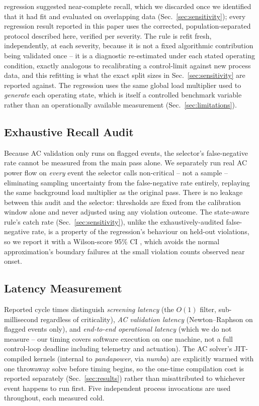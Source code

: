 \documentclass[11pt,conference]{IEEEtran}
\begin{document}
regression suggested near-complete recall, which we discarded once we identified that it had fit
and evaluated on overlapping data (Sec.~\ref{sec:sensitivity}); every regression result reported in
this paper uses the corrected, population-separated protocol described here, verified per severity.
The rule is refit fresh,
independently, at each severity, because it is not a fixed algorithmic contribution being validated
once -- it is a diagnostic re-estimated under each stated operating condition, exactly analogous to
recalibrating a control-limit against new process data, and this refitting is what the exact split
sizes in Sec.~\ref{sec:sensitivity} are reported against. The regression uses the same global load
multiplier used to \textit{generate} each operating state, which is itself a controlled benchmark
variable rather than an operationally available measurement (Sec.~\ref{sec:limitations}).

\subsection{Exhaustive Recall Audit}
\label{sec:audit}
Because AC validation only runs on flagged events, the selector's false-negative rate cannot be
measured from the main pass alone. We separately run real AC power flow on \textit{every} event the
selector calls non-critical -- not a sample -- eliminating sampling uncertainty from the
false-negative rate entirely, replaying the same background load multiplier as the original pass.
There is no leakage between this audit and the selector: thresholds are fixed from the calibration
window alone and never adjusted using any violation outcome. The state-aware rule's catch rate
(Sec.~\ref{sec:sensitivity}), unlike the exhaustively-audited false-negative rate, is a property of
the regression's behaviour on held-out violations, so we report it with a Wilson-score 95\% CI
\cite{ref:wilson1927}, which avoids the normal approximation's boundary failures at the small
violation counts observed near onset.

\subsection{Latency Measurement}
\label{sec:latency_method}
Reported cycle times distinguish \textit{screening latency} (the $O(1)$ filter, sub-millisecond
regardless of criticality), \textit{AC validation latency} (Newton--Raphson on flagged events only),
and \textit{end-to-end operational latency} (which we do not measure -- our timing covers software
execution on one machine, not a full control-loop deadline including telemetry and actuation). The
AC solver's JIT-compiled kernels (internal to \textit{pandapower}, via \textit{numba}) are
explicitly warmed with one throwaway solve before timing begins, so the one-time compilation cost is
reported separately (Sec.~\ref{sec:results}) rather than misattributed to whichever event happens to
run first. Five independent process invocations are used throughout, each measured cold.
\end{document}
